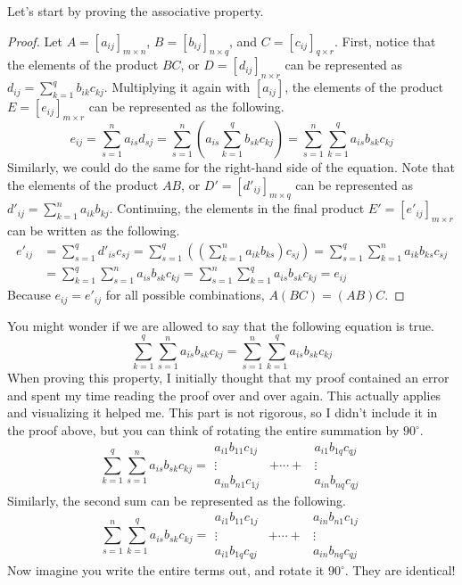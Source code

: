 \documentclass[../main.tex]{subfiles}
\begin{document}
Let's start by proving the associative property.
\begin{proof}
Let $A = [a_{ij}]_{m \times n}$, $B = [b_{ij}]_{n \times q}$,
and $C = [c_{ij}]_{q \times r}$. First, notice that the elements
of the product $BC$, or $D = [d_{ij}]_{n \times r}$ can be
represented as $d_{ij} = \sum_{k=1}^{q} b_{ik} c_{kj}$. Multiplying
it again with $[a_{ij}]$, the elements of the product
$E = [e_{ij}]_{m \times r}$ can be represented as the following.
\[
e_{ij}
= \sum_{s=1}^{n} a_{is} d_{sj}
= \sum_{s=1}^{n} \left(
    a_{is} \sum_{k=1}^{q} b_{sk} c_{kj}
\right)
= \sum_{s=1}^{n} \sum_{k=1}^{q} a_{is} b_{sk} c_{kj}
\]
Similarly, we could do the same for the right-hand side of the
equation. Note that the elements of the product $AB$, or
$D' = [d'_{ij}]_{m \times q}$ can be represented as
$d'_{ij} = \sum_{k=1}^{n} a_{ik} b_{kj}$. Continuing, the elements
in the final product $E' = [e'_{ij}]_{m \times r}$ can be written as
the following.
\begin{align*}
    e'_{ij}
    &= \sum_{s=1}^{q} d'_{is} c_{sj}
    = \sum_{s=1}^{q} \left(
        \left(\sum_{k=1}^{n} a_{ik} b_{ks} \right) c_{sj}
    \right)
    = \sum_{s=1}^{q} \sum_{k=1}^{n} a_{ik} b_{ks} c_{sj} \\
    &= \sum_{k=1}^{q} \sum_{s=1}^{n} a_{is} b_{sk} c_{kj}
    = \sum_{s=1}^{n} \sum_{k=1}^{q} a_{is} b_{sk} c_{kj}
    = e_{ij}
\end{align*}
Because $e_{ij} = e'_{ij}$ for all possible combinations,
$A(BC) = (AB)C$.
\end{proof}
\begin{thoughts}
You might wonder if we are allowed to say that the following equation
is true.
\[
\sum_{k=1}^{q} \sum_{s=1}^{n} a_{is} b_{sk} c_{kj}
= \sum_{s=1}^{n} \sum_{k=1}^{q} a_{is} b_{sk} c_{kj}
\]
When proving this property, I initially thought that my proof
contained an error and spent my time reading the proof over and
over again. This actually applies and visualizing it helped me.
This part is not rigorous, so I didn't include it in the proof
above, but you can think of rotating the entire summation by
$90^\circ$.
\[
\sum_{k=1}^{q} \sum_{s=1}^{n} a_{is} b_{sk} c_{kj}
=
\begin{array}{ccc}
    a_{i1}b_{11}c_{1j} & & a_{i1}b_{1q}c_{qj} \\
    \vdots & + \cdots + & \vdots \\
    a_{in}b_{n1}c_{1j} & & a_{in}b_{nq}c_{qj}
\end{array}
\]
Similarly, the second sum can be represented as the following.
\[
\sum_{s=1}^{n} \sum_{k=1}^{q} a_{is} b_{sk} c_{kj}
=
\begin{array}{ccc}
    a_{i1}b_{11}c_{1j} & & a_{in}b_{n1}c_{1j} \\
    \vdots & + \cdots + & \vdots \\
    a_{i1}b_{1q}c_{qj} & & a_{in}b_{nq}c_{qj}
\end{array}
\]
Now imagine you write the entire terms out, and rotate it
$90^\circ$. They are identical!
\end{thoughts}
\end{document}
